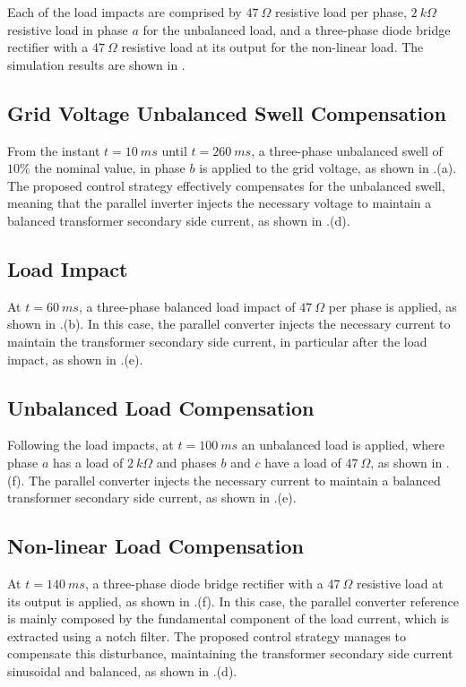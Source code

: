 Each of the load impacts are comprised by $47\ \Omega$ resistive load per phase, $2\ k\Omega$ resistive load in phase $a$ for the unbalanced load, and a three-phase diode bridge rectifier with a $47\ \Omega$ resistive load at its output for the non-linear load. The simulation results are shown in .

\subsection{Grid Voltage Unbalanced Swell Compensation}

From the instant $t = 10\ ms$ until $t = 260\ ms$, a three-phase unbalanced swell of $10\%$ the nominal value, in phase $b$ is applied to the grid voltage, as shown in .(a). The proposed control strategy effectively compensates for the unbalanced swell, meaning that the parallel inverter injects the necessary voltage to maintain a balanced transformer secondary side current, as shown in .(d).

\subsection{Load Impact}

At $t = 60\ ms$, a three-phase balanced load impact of $47\ \Omega$ per phase is applied, as shown in .(b). In this case, the parallel converter injects the necessary current to maintain the transformer secondary side current, in particular after the load impact, as shown in .(e).

\subsection{Unbalanced Load Compensation}

Following the load impacts, at $t = 100\ ms$ an unbalanced load is applied, where phase $a$ has a load of $2\ k\Omega$ and phases $b$ and $c$ have a load of $47\ \Omega$, as shown in .(f). The parallel converter injects the necessary current to maintain a balanced transformer secondary side current, as shown in .(e).

\subsection{Non-linear Load Compensation}

At $t = 140\ ms$, a three-phase diode bridge rectifier with a $47\ \Omega$ resistive load at its output is applied, as shown in .(f). In this case, the parallel converter reference is mainly composed by the fundamental component of the load current, which is extracted using a notch filter. The proposed control strategy manages to compensate this disturbance, maintaining the transformer secondary side current sinusoidal and balanced, as shown in .(d).

